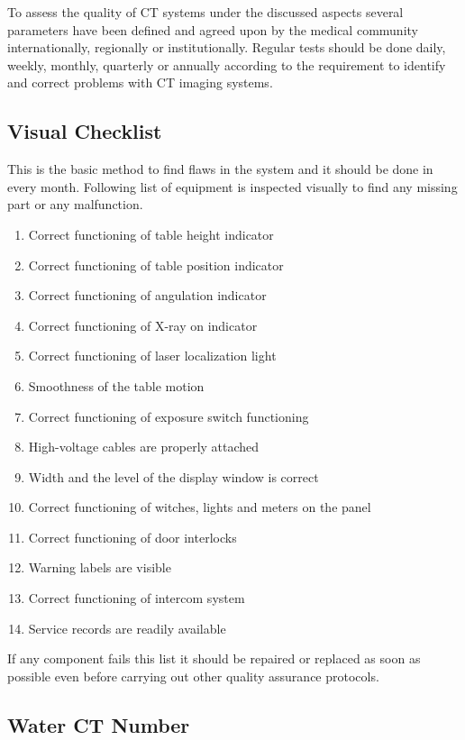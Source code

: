 \documentclass[12pt]{article}
\begin{document}
To assess the quality of CT systems under the discussed aspects several parameters have been defined and agreed upon by the medical community internationally, regionally or institutionally. Regular tests should be done daily, weekly, monthly, quarterly or annually according to the requirement to identify and correct problems with CT imaging systems.

\subsection{Visual Checklist}
This is the basic method to find flaws in the system and it should be done in every month. Following list of equipment is inspected visually to find any missing part or any malfunction. 

\begin{enumerate}
    \item Correct functioning of table height indicator
    \item Correct functioning of table position indicator
    \item Correct functioning of angulation indicator
    \item Correct functioning of X-ray on indicator
    \item Correct functioning of laser localization light
    \item Smoothness of the table motion
    \item Correct functioning of exposure switch functioning
    \item High-voltage cables are properly attached
    \item Width and the level of the display window is correct
    \item Correct functioning of witches, lights and meters on the panel
    \item Correct functioning of door interlocks
    \item Warning labels are visible
    \item Correct functioning of intercom system
    \item Service records are readily available
\end{enumerate}

If any component fails this list it should be repaired or replaced as soon as possible even before carrying out other quality assurance protocols. 
\newcommand{\mysubscript}[1]{\raisebox{-0.34ex}{\scriptsize#1}}
\subsection{Water CT Number}
\end{document}
